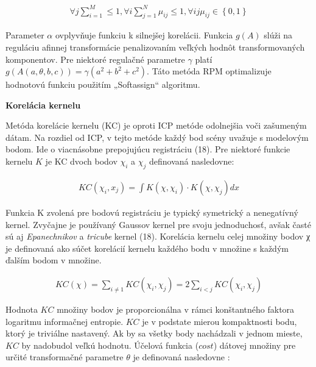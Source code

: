 \begin{equation}
\label{eq13}
\begin{aligned}
\forall j \sum_{i=1}^{M} \leq 1, \forall i \sum_{j=1}^{N} \mu_{ij} \leq 1, \forall ij \mu_{ij} \in \left\lbrace 0,1 \right\rbrace 
\end{aligned}
\end{equation}

Parameter $\alpha$ ovplyvňuje funkciu k silnejšej korelácii. Funkcia $g\left(A\right)$ slúži na reguláciu afinnej transformácie penalizovaním veľkých hodnôt transformovaných komponentov. Pre niektoré regulačné parametre $\gamma$ platí $g\left(A\left(a, \theta, b, c\right)\right) = \gamma \left(a^2 + b^2 + c^2 \right)$. Táto metóda RPM optimalizuje hodnotovú funkciu použitím „Softassign“ algoritmu. \newline

\textbf{Korelácia kernelu}

Metóda korelácie kernelu (KC) je oproti ICP metóde odolnejšia voči zašumeným dátam. Na rozdiel od ICP, v tejto metóde každý bod scény uvažuje s modelovým bodom. Ide o viacnásobne prepojujúcu registráciu (18). Pre niektoré funkcie kernelu $K$ je KC dvoch bodov $\chi_i$ a $\chi_j$ definovaná nasledovne:

\begin{equation}
\label{eq14}
\begin{aligned}
KC\left(\chi_i,x_j\right)=\int K\left(\chi,\chi_i\right) \cdot K\left(\chi,\chi_j\right) dx 
\end{aligned}
\end{equation}

Funkcia K zvolená pre bodovú registráciu je typický symetrický a nenegatívný kernel. Zvyčajne je používaný Gaussov kernel pre svoju jednoduchosť, avšak časté sú aj \textit{Epanechnikov} a \textit{tricube} kernel (18). Korelácia kernelu celej množiny bodov χ je definovaná ako súčet korelácií kernelu každého bodu v množine s každým ďalším bodom v množine.


\begin{equation}
\label{eq15}
\begin{aligned}
KC\left(\chi\right) = \sum_{i\ne1} KC\left(\chi_i,\chi_j\right)=2\sum_{i<j} KC\left(\chi_i,\chi_j\right)
\end{aligned}
\end{equation}

Hodnota $KC$ množiny bodov je proporcionálna v rámci konštantného faktora logaritmu informačnej entropie. $KC$ je v podstate mierou kompaktnosti bodu, ktorý je triviálne nastavený. Ak by sa všetky body nachádzali v jednom mieste, $KC$ by nadobudol veľkú hodnotu. Účelová funkcia ($cost$) dátovej množiny pre určité transformačné parametre $\theta$ je definovaná nasledovne :

